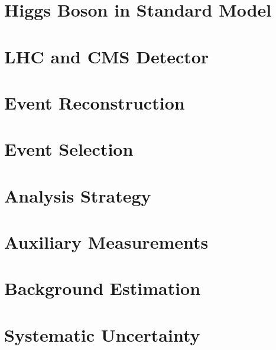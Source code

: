 \documentclass[12pt,chapterheads]{ucsd}
\begin{document}
%






%
\chapter{Higgs Boson in Standard Model}
\label{ch:intro_higgs}
%

%
\chapter{LHC and CMS Detector}
\label{ch:lhc_cms}
%

%
\chapter{Event Reconstruction}
\label{ch:event_reconstruction}
%

%
\chapter{Event Selection}
\label{ch:event_selection}
%

%
\chapter{Analysis Strategy}
\label{ch:analysis_strategy}
%

%
\chapter{Auxiliary Measurements}
\label{ch:auxiliary_measurement}
%

%
\chapter{Background Estimation}
\label{ch:background_estimation}
%

%
\chapter{Systematic Uncertainty}
\label{ch:systematics}

\end{document}
